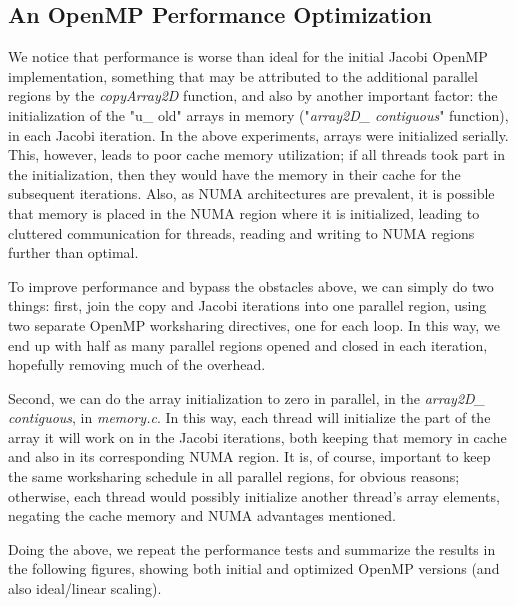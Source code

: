 \documentclass[11pt]{report}
\begin{document}
\subsection{An OpenMP Performance Optimization}
We notice that performance is worse than ideal for the initial Jacobi OpenMP implementation, something that may be attributed to the additional parallel regions by the \emph{copyArray2D} function, and also by another important factor: the initialization of the "u\_ old" arrays in memory ("\emph{array2D\_ contiguous}" function), in each Jacobi iteration. In the above experiments, arrays were initialized serially. This, however, leads to poor cache memory utilization; if all threads took part in the initialization, then they would have the memory in their cache for the subsequent iterations. Also, as NUMA architectures are prevalent, it is possible that memory is placed in the NUMA region where it is initialized, leading to cluttered communication for threads, reading and writing to NUMA regions further than optimal.
\newline

To improve performance and bypass the obstacles above, we can simply do two things: first, join the copy and Jacobi iterations into one parallel region, using two separate OpenMP worksharing directives, one for each loop. In this way, we end up with half as many parallel regions opened and closed in each iteration, hopefully removing much of the overhead.
\newline

Second, we can do the array initialization to zero in parallel, in the \emph{array2D\_ contiguous}, in \emph{memory.c}. In this way, each thread will initialize the part of the array it will work on in the Jacobi iterations, both keeping that memory in cache and also in its corresponding NUMA region. It is, of course, important to keep the same worksharing schedule in all parallel regions, for obvious reasons; otherwise, each thread would possibly initialize another thread's array elements, negating the cache memory and NUMA advantages mentioned.
\newline

Doing the above, we repeat the performance tests and summarize the results in the following figures, showing both initial and optimized OpenMP versions (and also ideal/linear scaling).
\end{document}

